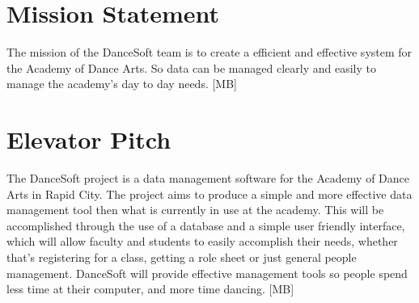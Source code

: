 
\section{Mission Statement}
The mission of the DanceSoft team is to create a efficient and effective system for the Academy of Dance Arts. So data can be managed clearly and easily to manage the academy's day to day needs. [MB]

\section{Elevator Pitch}
The DanceSoft project is a data management software for the Academy of Dance Arts in Rapid City. The project aims to produce a simple and more effective data management tool then what is currently in use at the academy. This will be accomplished through the use of a database and a simple user friendly interface, which will allow faculty and students to easily accomplish their needs, whether that's registering for a class, getting a role sheet or just general people management. DanceSoft will provide effective management tools so people spend less time at their computer, and more time dancing. [MB]  
